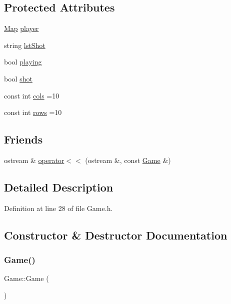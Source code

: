 \subsection*{Protected Attributes}
\begin{DoxyCompactItemize}
\item 
\hyperlink{struct_map}{Map} \hyperlink{class_game_a3be2e2f353ec3c6dbffff9f8557e7280}{player}
\item 
string \hyperlink{class_game_afd1843aa37acf5d5c33cc7eeb1ffe88f}{lst\+Shot}
\item 
bool \hyperlink{class_game_a42af2652c4ec21a2e6445fe866d01828}{playing}
\item 
bool \hyperlink{class_game_aaf0b60de36091e3a4115004999e4dc7a}{shot}
\item 
const int \hyperlink{class_game_a11dd2c238611d9080277e9766b48c772}{cols} =10
\item 
const int \hyperlink{class_game_ae882486dec6d9507bbef7f44aaf07db5}{rows} =10
\end{DoxyCompactItemize}
\subsection*{Friends}
\begin{DoxyCompactItemize}
\item 
ostream \& \hyperlink{class_game_a7bb9176e07b6f6c73c930dba6400265f}{operator$<$$<$} (ostream \&, const \hyperlink{class_game}{Game} \&)
\end{DoxyCompactItemize}


\subsection{Detailed Description}


Definition at line 28 of file Game.\+h.



\subsection{Constructor \& Destructor Documentation}
\mbox{\label{class_game_ad59df6562a58a614fda24622d3715b65}} 
\subsubsection{\texorpdfstring{Game()}{Game()}}
{\footnotesize\ttfamily Game\+::\+Game (\begin{DoxyParamCaption}{ }\end{DoxyParamCaption})}




